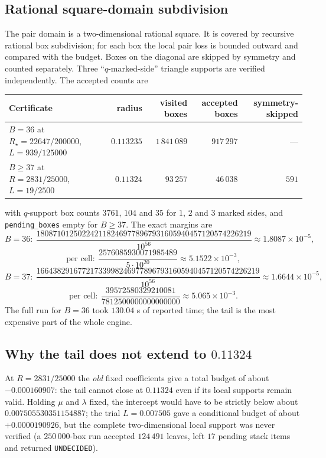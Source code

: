 \subsection{Rational square-domain subdivision}

The pair domain is a two-dimensional rational square. It is covered by recursive rational box
subdivision; for each box the local pair loss is bounded outward and compared with the budget. Boxes
on the diagonal are skipped by symmetry and counted separately. Three ``$q$-marked-side'' triangle
supports are verified independently. The accepted counts are

\begin{center}
\footnotesize
\begin{tabular}{@{}lrrrr@{}}
\toprule
Certificate & radius & visited boxes & accepted boxes & symmetry-skipped \\
\midrule
$B=36$ at $R_\star=22647/200000$, $L=939/125000$ & $0.113235$ & $1\,841\,089$ & $917\,297$ & --- \\
$B\ge37$ at $R=2831/25000$, $L=19/2500$ & $0.11324$ & $93\,257$ & $46\,038$ & $591$ \\
\bottomrule
\end{tabular}
\end{center}

with $q$-support box counts $3761$, $104$ and $35$ for $1$, $2$ and $3$ marked sides, and
\texttt{pending\_\allowbreak{}boxes} empty for $B\ge37$. The exact margins are
\[
B=36:\ \frac{1808710125022421182469778967931605940457120574226219}{10^{56}}
\approx1.8087\times10^{-5},
\]
\[
\text{per cell}:\ \frac{2576085930071985489}{5\cdot10^{20}}\approx5.1522\times10^{-3},
\]
\[
B=37:\ \frac{166438291677217339982469778967931605940457120574226219}{10^{56}}
\approx1.6644\times10^{-5},
\]
\[
\text{per cell}:\ \frac{39572580329210081}{7812500000000000000}\approx5.065\times10^{-3}.
\]
The full run for $B=36$ took $130.04$ s of reported time; the tail is the most expensive part of the
whole engine.

\subsection{Why the tail does not extend to $0.11324$}

At $R=2831/25000$ the \emph{old} fixed coefficients give a total budget of about $-0.000160907$: the
tail cannot close at $0.11324$ even if its local supports remain valid. Holding $\mu$ and $\lambda$
fixed, the intercept would have to be strictly below about $0.007505530351154887$; the trial
$L=0.007505$ gave a conditional budget of about $+0.0000190926$, but the complete two-dimensional
local support was never verified (a $250\,000$-box run accepted $124\,491$ leaves, left $17$ pending
stack items and returned \texttt{UNDECIDED}).

